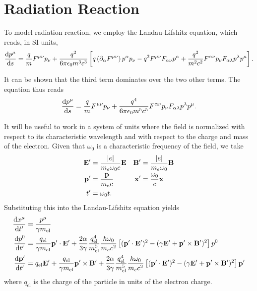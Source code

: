 \documentclass[10pt,letterpaper,extrafontsizes, onecolumn,openright]{memoir}
\begin{document}
\section{Radiation Reaction}

To model radiation reaction, we employ the Landau-Lifshitz equation, which
reads, in SI units,
  \begin{equation}
    \dv{p^\mu}{s} = \frac{q}{m}F^{\mu\nu}p_\nu
                   +\frac{q^2}{6\pi\epsilon_0m^3c^3}
                      \left[
                        q\left(\partial_\alpha F^{\mu\nu}\right)p^\alpha p_\nu
                      - q^2 F^{\mu\nu}F_{\alpha\nu}p^\alpha
                      + \frac{q^2}{m^2c^2} F^{\alpha\nu}p_\nu F_{\alpha\lambda}p^\lambda p^\mu
                      \right].
  \end{equation}

It can be shown \cite{} that the third term dominates over the two other terms.
The equation thus reads
  \begin{equation}
    \dv{p^\mu}{s} = \frac{q}{m}F^{\mu\nu}p_\nu
                   +\frac{q^4}{6\pi\epsilon_0m^5c^5}F^{\alpha\nu}p_\nu F_{\alpha\lambda}p^\lambda p^\mu.
  \end{equation}

It will be useful to work in a system of units where the field is normalized with
respect to its characteristic wavelength and with respect to the charge and mass
of the electron. Given that $\omega_0$ is a characteristic frequency of the field,
we take
  \begin{subequations}
  \begin{align}
    \vb{E}' &= \frac{|e|}{m_e\omega_0 c} \vb{E} & \vb{B}' &= \frac{|e|}{m_e\omega_0}\vb{B} \\
    \vb{p}' &= \frac{\vb{p}}{m_ec}              & \vb{x}' &= \frac{\omega_0}{c}\vb{x}    \\
    t'      &= \omega_0 t.
  \end{align}
  \end{subequations}
Substituting this into the Landau-Lifshitz equation yields
  \begin{align}
  	\dv{x^\mu}{t'}   &= \frac{p^\mu}{\gamma m_\text{el}} \\
    \dv{p^0}{t'}     &= \frac{q_\text{el}}{\gamma m_\text{el}}\vb{p}'\cdot\vb{E}'
                       +\frac{2\alpha}{3\gamma}\frac{q_\text{el}^4}{m_\text{el}^5}\frac{\hbar\omega_0}{m_ec^2}
                      \left[(\vb{p}'\cdot\vb{E}')^2-(\gamma\vb{E}'+\vb{p}'\times\vb{B}')^2\right]p^0 \\
    \dv{\vb{p}'}{t'} &= q_\text{el}\vb{E}' +\frac{q_\text{el}}{\gamma m_\text{el}}\vb{p}'\times\vb{B}'
                      +\frac{2\alpha}{3\gamma}\frac{q_\text{el}^4}{m_\text{el}^5}\frac{\hbar\omega_0}{m_ec^2}
                      \left[(\vb{p}'\cdot\vb{E}')^2-(\gamma\vb{E}'+\vb{p}'\times\vb{B}')^2\right]\vb{p}'
  \end{align}
where $q_\text{el}$ is the charge of the particle in units of the electron charge.
\end{document}
